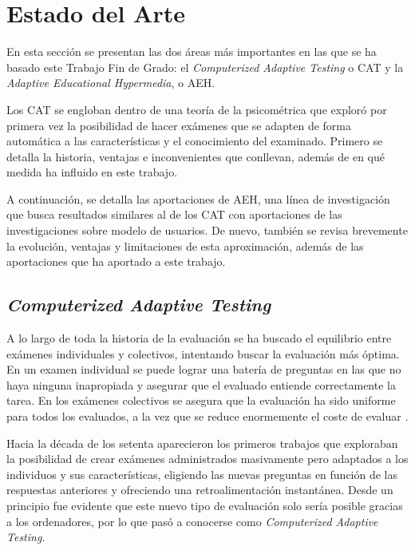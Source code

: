 \chapter{Estado del Arte\label{sec:estado_del_arte}}

En esta sección se presentan las dos áreas más importantes en las que se ha basado este Trabajo Fin de Grado: el \textit{Computerized Adaptive Testing} o \acrshort{CAT} y la \textit{Adaptive Educational Hypermedia}, o \acrshort{AEH}.

Los \acrshort{CAT} se engloban dentro de una teoría de la psicométrica que exploró por primera vez la posibilidad de hacer exámenes que se adapten de forma automática a las características y el conocimiento del examinado. Primero se detalla la historia, ventajas e inconvenientes que conllevan, además de en qué medida ha influido en este trabajo. 

A continuación, se detalla las aportaciones de \acrshort{AEH}, una línea de investigación que busca resultados similares al de los \acrshort{CAT} con aportaciones de las investigaciones sobre modelo de usuarios. De nuevo, también se revisa brevemente la evolución, ventajas y limitaciones de esta aproximación, además de las aportaciones que ha aportado a este trabajo.

\section{\textit{Computerized Adaptive Testing}}

A lo largo de toda la historia de la evaluación se ha buscado el equilibrio entre exámenes individuales y colectivos, intentando buscar la evaluación más óptima. En un examen individual se puede lograr una batería de preguntas en las que no haya ninguna inapropiada y asegurar que el evaluado entiende correctamente la tarea. En los exámenes colectivos se asegura que la evaluación ha sido uniforme para todos los evaluados, a la vez que se reduce enormemente el coste de evaluar \cite{Wainer00}.

Hacia la década de los setenta aparecieron los primeros trabajos que exploraban la posibilidad de crear exámenes administrados masivamente pero adaptados a los individuos y sus características, eligiendo las nuevas preguntas en función de las respuestas anteriores y ofreciendo una retroalimentación instantánea\cite{Lord68}. Desde un principio fue evidente que este nuevo tipo de evaluación solo sería posible gracias a los ordenadores, por lo que pasó a conocerse como \textit{Computerized Adaptive Testing}.

